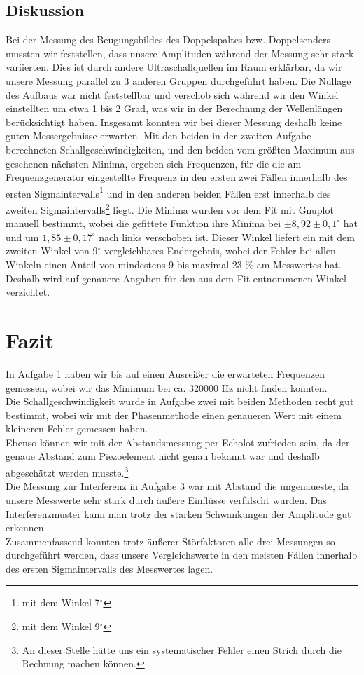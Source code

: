\documentclass[12pt]{scrartcl}
\begin{document}
\subsection{Diskussion}
Bei der Messung des Beugungsbildes des Doppelspaltes bzw. Doppelsenders mussten wir feststellen, dass unsere Amplituden während der Messung sehr stark variierten. Dies ist durch andere Ultraschallquellen im Raum erklärbar, da wir unsere Messung parallel zu 3 anderen Gruppen durchgeführt haben. Die Nullage des Aufbaus war nicht feststellbar und verschob sich während wir den Winkel einstellten um etwa 1 bis 2 Grad, was wir in der Berechnung der Wellenlängen berücksichtigt haben. Insgesamt konnten wir bei dieser Messung deshalb keine guten Messergebnisse erwarten. Mit den beiden in der zweiten Aufgabe berechneten Schallgeschwindigkeiten, und den beiden vom größten Maximum aus gesehenen nächsten Minima, ergeben sich Frequenzen, für die die am Frequenzgenerator eingestellte Frequenz in den ersten zwei Fällen innerhalb des ersten Sigmaintervalls\footnote{mit dem Winkel 7$^{\circ}$} und in den anderen beiden Fällen erst innerhalb des zweiten Sigmaintervalls\footnote{mit dem Winkel 9$^{\circ}$} liegt.
Die Minima wurden vor dem Fit mit Gnuplot manuell bestimmt, wobei die gefittete Funktion ihre Minima bei $\pm 8,92 \pm 0,1 ^{\circ}$ hat und um $1,85 \pm 0,17 ^{\circ}$ nach links verschoben ist. Dieser Winkel liefert ein mit dem zweiten Winkel von 9$^{\circ}$ vergleichbares Endergebnis, wobei der Fehler bei allen Winkeln einen Anteil von mindestens 9 bis maximal 23 \% am Messwertes hat. Deshalb wird auf genauere Angaben für den aus dem Fit entnommenen Winkel verzichtet.

\section{Fazit}
In Aufgabe 1 haben wir bis auf einen Ausreißer die erwarteten Frequenzen gemessen, wobei wir das Minimum bei ca. 320000 Hz nicht finden konnten.\\
Die Schallgeschwindigkeit wurde in Aufgabe zwei mit beiden Methoden recht gut bestimmt, wobei wir mit der Phasenmethode einen genaueren Wert mit einem kleineren Fehler gemessen haben.\\
Ebenso können wir mit der Abstandsmessung per Echolot zufrieden sein, da der genaue Abstand zum Piezoelement nicht genau bekannt war und deshalb abgeschätzt werden musste.\footnote{An dieser Stelle hätte uns ein systematischer Fehler einen Strich durch die Rechnung machen können.}\\
Die Messung zur Interferenz in Aufgabe 3 war mit Abstand die ungenaueste, da unsere Messwerte sehr stark durch äußere Einflüsse verfälscht wurden. Das Interferenzmuster kann man trotz der starken Schwankungen der Amplitude gut erkennen.\\
Zusammenfassend konnten trotz äußerer Störfaktoren alle drei Messungen so durchgeführt werden, dass unsere Vergleichswerte in den meisten Fällen innerhalb des ersten Sigmaintervalls des Messwertes lagen. 

\end{document}
